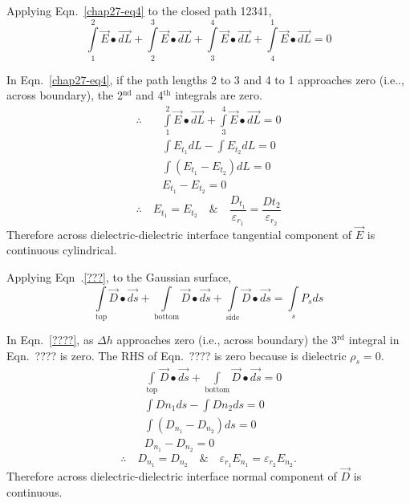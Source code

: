 Applying Eqn.~\eqref{chap27-eq4} to the closed path 12341,
\begin{equation*}
\int\limits_{1}^{2} \overrightarrow{E} \bullet \overrightarrow{dL} + \int\limits_{2}^{3} \overrightarrow{E} \bullet \overrightarrow{dL} + \int\limits_{3}^{4} \overrightarrow{E} \bullet \overrightarrow{dL} + \int\limits_{4}^{1} \overrightarrow{E} \bullet \overrightarrow{dL} = 0\label{chap27-eq4}
\end{equation*}

In Eqn.~\eqref{chap27-eq4}, if the path lengths 2 to 3 and 4 to 1 approaches zero (i.e.., across boundary), the 2$^{\text{nd}}$ and 4$^{\text{th}}$ integrals are zero. 
\begin{align*}
\therefore\quad  &\int\limits_{1}^{2} \overrightarrow{E} \bullet \overrightarrow{dL} + \int\limits_{3}^{4} \overrightarrow{E} \bullet \overrightarrow{dL} = 0\\
 & \int E_{t_{1}}dL - \int E_{t_{2}}dL  = 0\\
 & \int \left(E_{t_{1}} - E_{t_{2}}\right)dL  = 0\\
 & E_{t_{1}} - E_{t_{2}} = 0
\end{align*} 
$$
\therefore\quad E_{t_{1}} = E_{t_{2}} \quad\text{\&}\quad \dfrac{D_{t_{1}}}{\varepsilon_{r_{1}}} = \dfrac{Dt_{2}}{\varepsilon_{r_{2}}}
$$
Therefore across dielectric-dielectric interface 
tangential component of $\overrightarrow{E}$ is continuous cylindrical. 

Applying Eqn~.\eqref{???}, to the Gaussian surface, 
\begin{equation*}
\int\limits_{\text{top}} \overrightarrow{D} \bullet \overrightarrow{ds} + \int\limits_{\text{bottom}} \overrightarrow{D} \bullet \overrightarrow{ds} + \int\limits_{\text{side}} \overrightarrow{D} \bullet \overrightarrow{ds} = \int\limits_{s} P_{s}ds\label{chap27-eq27.5}
\end{equation*}

In Eqn.~\eqref{????}, as $\Delta h$ approaches zero (i.e., across boundary) the 3$^{\text{rd}}$ integral in Eqn.~???? is zero. The RHS of Eqn.~???? is zero because is dielectric $\rho_{s} = 0$.
\begin{align*}
& \int\limits_{\text{top}} \overrightarrow{D} \bullet \overrightarrow{ds} + \int\limits_{\text{bottom}} \overrightarrow{D} \bullet \overrightarrow{ds} = 0\\
& \int Dn_{1}ds - \int Dn_{2}ds  = 0\\
& \int (D_{n_{1}} - D_{n_{2}})ds = 0\\
& D_{n_{1}} - D_{n_{2}}  = 0
\end{align*}
$$
\therefore\quad  D_{n_{1}} = D_{n_{2}}  \quad\text{\&}\quad \varepsilon_{r_{1}}E_{n_{1}} = \varepsilon_{r_{2}}E_{n_{2}}. 
$$
Therefore across dielectric-dielectric interface normal component of $\overrightarrow{D}$ is continuous. 

